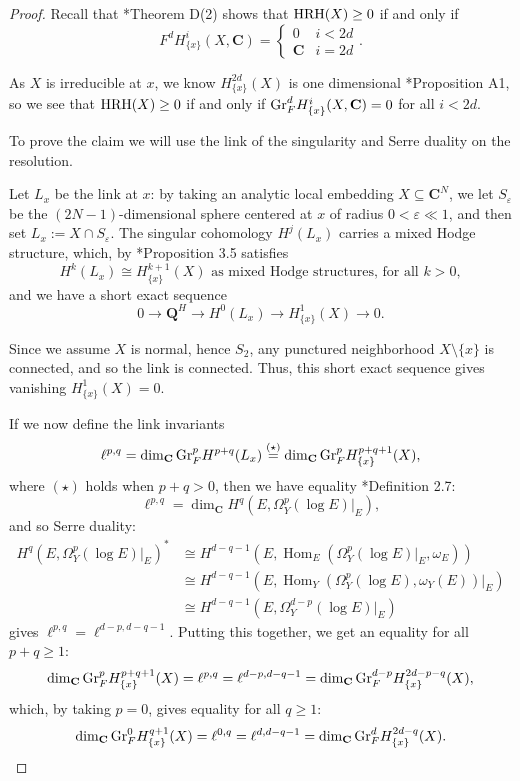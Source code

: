 \documentclass[letterpaper,11pt]{amsart}
\theoremstyle{plain}
\theoremstyle{definition}
\theoremstyle{remark}
\def\Q{{\mathbf Q}}
\def\C{{\mathbf C}}
\DeclareMathOperator{\Hom} {Hom}
\begin{document}
\begin{proof} Recall that \cite{DOR1}*{Theorem D(2)} shows that ${\rm HRH}(X) \geq 0$ if and only if
\[ F^{d} H^i_{\{x\}}(X,\C) = \begin{cases} 0 & i < 2d \\ \C & i = 2 d\end{cases}.\]

As $X$ is irreducible at $x$, we know $H^{2d}_{\{x\}}(X)$ is one dimensional \cite{Brion}*{Proposition A1}, so we see that ${\rm HRH}(X) \geq 0$ if and only if ${\rm Gr}_F^d H^i_{\{x\}}(X,\C) = 0$ for all $i  < 2d$.

To prove the claim we will use the link of the singularity and Serre duality on the resolution. 

Let $L_x$ be the link at $x$: by taking an analytic local embedding $X\subseteq \C^N$, we let $S_{\varepsilon}$ be the $(2N-1)$-dimensional sphere centered at $x$ of radius $0 < \varepsilon \ll 1$, and then set $L_x := X \cap S_{\varepsilon}$. The singular cohomology $H^j(L_x)$ carries a mixed Hodge structure, which, by \cite{DurfeeSaito}*{Proposition 3.5} satisfies
\[ H^k(L_x) \cong H^{k+1}_{\{x\}}(X) \text{ as mixed Hodge structures, for all } k > 0,\]
and we have a short exact sequence
\[ 0 \to \Q^H \to H^0(L_x) \to H^1_{\{x\}}(X) \to 0.\]

Since we assume $X$ is normal, hence $S_2$, any punctured neighborhood $X\setminus \{x\}$ is connected, and so the link is connected. Thus, this short exact sequence gives vanishing $H^1_{\{x\}}(X) = 0$. 

If we now define the link invariants 
\[
\ell^{p,q} = \dim_\C {\rm Gr}_F^p H^{p+q}(L_x) \overset{(\star)}{=} \dim_\C {\rm Gr}_F^p H^{p+q+1}_{\{x\}}(X),
\]
where $(\star)$ holds when $p+q>0$, then we have equality \cite{FL3}*{Definition 2.7}:
\[ \ell^{p,q} = \dim_{\C} H^q(E,\Omega_Y^p(\log E)\vert_E),\]
and so Serre duality:
\begin{align*}
H^q(E,\Omega_Y^p(\log E)|_E)^* &\cong H^{d-q-1}(E, \Hom_E\left(\Omega_Y^p(\log E)|_E, \omega_E\right)) \\
&\cong H^{d-q-1}(E, \Hom_Y\left(\Omega_Y^p(\log E), \omega_Y(E)\right)\!|_E)\\
&\cong  H^{d-q-1}(E, \Omega_Y^{d-p}(\log E)|_E)
\end{align*}
gives $\ell^{p,q} = \ell^{d-p,d-q-1}$. Putting this together, we get an equality for all $p+q \geq 1$:
\[ \dim_\C {\rm Gr}_F^{p} H^{p+q+1}_{\{x\}}(X) = \ell^{p, q} = \ell^{d-p, d-q-1} =  \dim_\C {\rm Gr}_F^{d -p} H^{2d -p-q}_{\{x\}}(X),\]
which, by taking $p=0$, gives equality for all $q\geq 1$:
\begin{equation} \label{eq-SerreDualLocCoh} \dim_\C {\rm Gr}_F^{0} H^{q+1}_{\{x\}}(X) = \ell^{0,q} = \ell^{d,d-q-1} = \dim_\C {\rm Gr}_F^{d} H^{2d -q}_{\{x\}}(X).\end{equation}



\end{proof}
\end{document}
